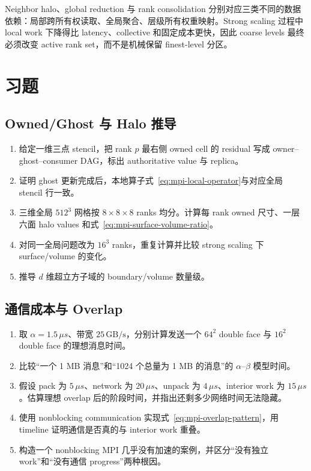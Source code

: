 Neighbor halo、global reduction 与 rank consolidation 分别对应三类不同的数据依赖：局部跨所有权读取、全局聚合、层级所有权重映射。Strong scaling 过程中 local work 下降得比 latency、collective 和固定成本更快，因此 coarse levels 最终必须改变 active rank set，而不是机械保留 finest-level 分区。

\section*{习题}

\subsection*{Owned/Ghost 与 Halo 推导}
\begin{enumerate}[label=\arabic*.]
\item 给定一维三点 stencil，把 rank $p$ 最右侧 owned cell 的 residual 写成 owner--ghost--consumer DAG，标出 authoritative value 与 replica。
\item 证明 ghost 更新完成后，本地算子式~\eqref{eq:mpi-local-operator}与对应全局 stencil 行一致。
\item 三维全局 $512^3$ 网格按 $8\times8\times8$ ranks 均分。计算每 rank owned 尺寸、一层六面 halo values 和式~\eqref{eq:mpi-surface-volume-ratio}。
\item 对同一全局问题改为 $16^3$ ranks，重复计算并比较 strong scaling 下 surface/volume 的变化。
\item 推导 $d$ 维超立方子域的 boundary/volume 数量级。
\end{enumerate}

\subsection*{通信成本与 Overlap}
\begin{enumerate}[label=\arabic*.]
\item 取 $\alpha=1.5\,\mu s$、带宽 $25\,\mathrm{GB/s}$，分别计算发送一个 $64^2$ double face 与 $16^2$ double face 的理想消息时间。
\item 比较“一个 1 MB 消息”和“1024 个总量为 1 MB 的消息”的 $\alpha$--$\beta$ 模型时间。
\item 假设 pack 为 $5\,\mu s$、network 为 $20\,\mu s$、unpack 为 $4\,\mu s$、interior work 为 $15\,\mu s$。估算理想 overlap 后的阶段时间，并指出还剩多少网络时间无法隐藏。
\item 使用 nonblocking communication 实现式~\eqref{eq:mpi-overlap-pattern}，用 timeline 证明通信是否真的与 interior work 重叠。
\item 构造一个 nonblocking MPI 几乎没有加速的案例，并区分“没有独立 work”和“没有通信 progress”两种根因。
\end{enumerate}

